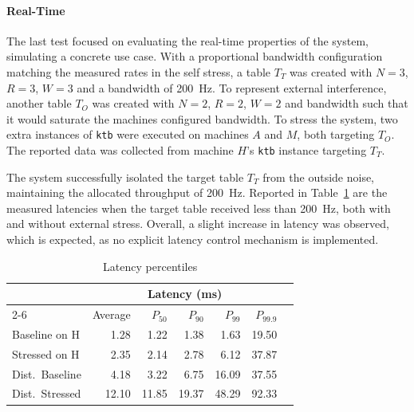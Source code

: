 \paragraph{Real-Time}
The last test focused on evaluating the real-time properties of the system, simulating a concrete use case.
With a proportional bandwidth configuration matching the measured rates in the self stress,
a table $T_T$ was created with $N=3$, $R=3$, $W=3$ and a bandwidth of \SI{200}{\hertz}.
To represent external interference, another table $T_O$ was created with $N=2$, $R=2$, $W=2$
and bandwidth such that it would saturate the machines configured bandwidth.
To stress the system, two extra instances of \texttt{ktb} were executed on machines $A$ and $M$, both targeting $T_O$.
The reported data was collected from machine $H$'s \texttt{ktb} instance targeting $T_T$.

The system successfully isolated the target table $T_T$ from the outside noise, maintaining the allocated throughput of \SI{200}{\hertz}.
Reported in Table~\ref{tab:results-isolation} are the measured latencies when the target table received less than \SI{200}{\hertz},
both with and without external stress.
Overall, a slight increase in latency was observed, which is expected, as no explicit latency control mechanism is implemented.

\begin{table}
    \centering
    \caption{Latency percentiles}
    \label{tab:results-isolation}
    \begin{tabular}{lrrrrrr}
        \toprule
        \multirow{2}{*}{\raisebox{-0.5ex}{Test Case}} & \multicolumn{5}{c}{Latency (\si{\milli\second})} \\
        \cmidrule{2-6}
        & Average & $P_{50}$ & $P_{90}$ & $P_{99}$ & $P_{99.9}$ \\
        \midrule
        Baseline on H   & 1.28    & 1.22     & 1.38     & 1.63     & 19.50      \\
        Stressed on H   & 2.35    & 2.14     & 2.78     & 6.12     & 37.87      \\
        Dist.\ Baseline & 4.18    & 3.22     & 6.75     & 16.09    & 37.55      \\
        Dist.\ Stressed & 12.10   & 11.85    & 19.37    & 48.29    & 92.33      \\
        \bottomrule
    \end{tabular}
\end{table}


